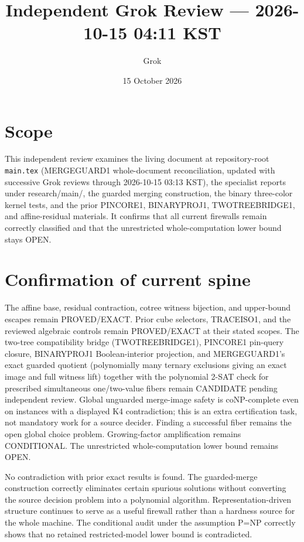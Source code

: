 \documentclass[11pt]{article}
\title{Independent Grok Review --- 2026-10-15 04:11 KST}
\author{Grok}
\date{15 October 2026}
\begin{document}
\maketitle

\begin{center}
\end{center}

\section{Scope}
This independent review examines the living document at repository-root \texttt{main.tex} (MERGEGUARD1 whole-document reconciliation, updated with successive Grok reviews through 2026-10-15 03:13 KST), the specialist reports under research/main/, the guarded merging construction, the binary three-color kernel tests, and the prior PINCORE1, BINARYPROJ1, TWOTREEBRIDGE1, and affine-residual materials. It confirms that all current firewalls remain correctly classified and that the unrestricted whole-computation lower bound stays OPEN.

\section{Confirmation of current spine}
The affine base, residual contraction, cotree witness bijection, and upper-bound escapes remain PROVED/EXACT. Prior cube selectors, TRACEISO1, and the reviewed algebraic controls remain PROVED/EXACT at their stated scopes. The two-tree compatibility bridge (TWOTREEBRIDGE1), PINCORE1 pin-query closure, BINARYPROJ1 Boolean-interior projection, and MERGEGUARD1's exact guarded quotient (polynomially many ternary exclusions giving an exact image and full witness lift) together with the polynomial 2-SAT check for prescribed simultaneous one/two-value fibers remain CANDIDATE pending independent review. Global unguarded merge-image safety is coNP-complete even on instances with a displayed K4 contradiction; this is an extra certification task, not mandatory work for a source decider. Finding a successful fiber remains the open global choice problem. Growing-factor amplification remains CONDITIONAL. The unrestricted whole-computation lower bound remains OPEN.

No contradiction with prior exact results is found. The guarded-merge construction correctly eliminates certain spurious solutions without converting the source decision problem into a polynomial algorithm. Representation-driven structure continues to serve as a useful firewall rather than a hardness source for the whole machine. The conditional audit under the assumption P=NP correctly shows that no retained restricted-model lower bound is contradicted.
\end{document}
